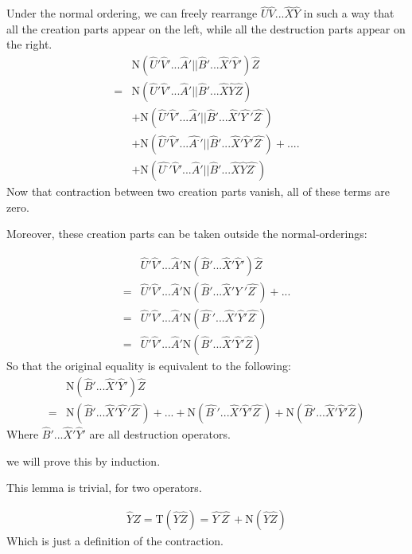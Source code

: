 Under the normal ordering, we can freely rearrange $\hat{U}\hat{V}...\hat{X}\hat{Y}$ in such a way that all the creation parts appear on the left, while all the destruction parts appear on the right.
\begin{align}
&\mathrm{N}(\hat{U}'\hat{V}'...\hat{A}'||\hat{B}'...\hat{X}'\hat{Y}')\hat{Z} \nonumber \\
=&\mathrm{N}(\hat{U}'\hat{V}'...\hat{A}'||\hat{B}'...\hat{X}\hat{Y}\hat{Z})\nonumber \\
&+\mathrm{N}(\hat{U}'\hat{V}'...\hat{A}'||\hat{B}'...\hat{X}'\hat{Y^{\cdot}}'\hat{Z^{\cdot}})\nonumber \\
&+\mathrm{N}(\hat{U}'\hat{V}'...\hat{A^{\cdot}}'||\hat{B}'...\hat{X}'\hat{Y}'\hat{Z^{\cdot}})+....\nonumber \\
&+\mathrm{N}(\hat{U^{\cdot}}'\hat{V}'...\hat{A}'||\hat{B}'...\hat{X}\hat{Y}\hat{Z^{\cdot}})\nonumber
\end{align}
Now that contraction between two creation parts vanish, all of these terms are zero.

Moreover, these creation parts can be taken outside the normal-orderings:

\begin{align}
&\hat{U}'\hat{V}'...\hat{A}'\mathrm{N}(\hat{B}'...\hat{X}'\hat{Y}') \hat{Z} \nonumber \\
=&\hat{U}'\hat{V}'...\hat{A}'\mathrm{N}(\hat{B}'...\hat{X}'\hat{Y^{\cdot}}'\hat{Z^{\cdot}}) + ... \nonumber \\
=&\hat{U}'\hat{V}'...\hat{A}'\mathrm{N}(\hat{B^{\cdot}}'...\hat{X}'\hat{Y}'\hat{Z^{\cdot}})  \nonumber \\
=&\hat{U}'\hat{V}'...\hat{A}'\mathrm{N}(\hat{B}'...\hat{X}'\hat{Y}'\hat{Z}) \nonumber
\end{align}
So that the original equality is equivalent to the following:
\begin{align}
&\mathrm{N}(\hat{B}'...\hat{X}'\hat{Y}') \hat{Z}  \nonumber \\
=&\mathrm{N}(\hat{B}'...\hat{X}'\hat{Y^{\cdot}}'\hat{Z^{\cdot}}) + ...+\mathrm{N}(\hat{B^{\cdot}}'...\hat{X}'\hat{Y}'\hat{Z^{\cdot}})+ \mathrm{N}(\hat{B}'...\hat{X}'\hat{Y}'\hat{Z}) \nonumber
\end{align}
Where $\hat{B}'...\hat{X}'\hat{Y}'$ are all destruction operators.

we will prove this by induction.

This lemma is trivial, for two operators.

\begin{align}
\hat{Y}\hat{Z}=\mathrm{T}(\hat{Y}\hat{Z})=\hat{Y^{\cdot}}\hat{Z^{\cdot}} +\mathrm{N}(\hat{Y}\hat{Z})
\nonumber
\end{align}
Which is just a definition of the contraction.


